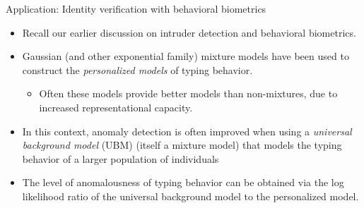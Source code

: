 \documentclass[10pt]{beamer}
\newcommand{\sumn}{\sum_{i=1}^{n}}
\newcommand{\soft}{r} %
\begin{document}

\begin{frame}{Application: Identity verification with behavioral biometrics}

\begin{itemize}
\item Recall our earlier discussion on intruder detection and behavioral biometrics.
\item Gaussian  (and other exponential family) mixture models have been used to construct the \textit{personalized models} of typing behavior. 
	\begin{itemize}
	\item Often these models provide better models than non-mixtures, due to increased representational capacity.
	\end{itemize}
\item In this context, anomaly detection is often improved when using a \textit{universal background model} (UBM) (itself a mixture model) that models the typing behavior of a larger population of individuals 
\item The level of anomalousness of typing behavior  can be obtained via the log likelihood ratio of the universal background model to the personalized model.
\end{itemize}

\end{frame}
\end{document}

